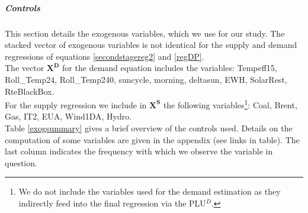 \subparagraph{Controls}
\label{controlssec}

This section details the exogenous variables, which we use for our study. The stacked vector of exogenous variables is not identical for the supply and demand regressions of equations \ref{secondstagereg2} and \ref{regDP}.\\ 

The vector $\boldsymbol{X^D}$ for the demand equation includes the variables: Tempeff15, Roll\_Temp24, Roll\_Temp240, suncycle, morning, deltasun, EWH, SolarRest, RteBlackBox.\\

For the supply regression we include in $\boldsymbol{X^S}$ the following variables\footnote{We do not include the variables used for the demand estimation as they indirectly feed into the final regression via the PLU$^D$.}: 
Coal, Brent, Gas, IT2, EUA, Wind1DA, Hydro. \\
 
Table \ref{exogsummary} gives a brief overview of the controls used. Details on the computation of some  variables are given in the appendix (see links in table). The last column indicates the frequency with which we observe the variable in question. 

